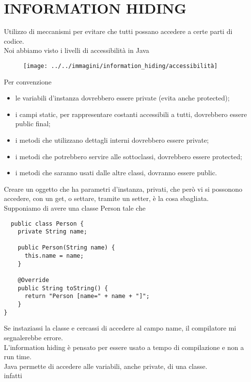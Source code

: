 \chapter{INFORMATION HIDING}

Utilizzo di meccanismi per evitare che tutti possano accedere a certe parti di codice.\\
Noi abbiamo visto i livelli di accessibilità in Java

\begin{figure}[H]
  \centering
  \texttt{[image: ../../immagini/information\_hiding/accessibilità]}
\end{figure}

Per convenzione

\begin{itemize}
  \item le variabili d'instanza dovrebbero essere private (evita anche protected);
  \item i campi static, per rappresentare costanti accessibili a tutti, dovrebbero essere public final;
  \item i metodi che utilizzano dettagli interni dovrebbero essere private;
  \item i metodi che potrebbero servire alle sottoclassi, dovrebbero essere protected;
  \item i metodi che saranno usati dalle altre classi, dovranno essere public.
\end{itemize}

Creare un oggetto che ha parametri d'instanza, privati, che però vi si possonono accedere, con un get, o settare, tramite un setter, è la cosa sbagliata.\\
Supponiamo di avere una classe Person tale che

\begin{lstlisting}
  public class Person {
    private String name;
    
    public Person(String name) {
      this.name = name;
    }
    
    @Override
    public String toString() {
      return "Person [name=" + name + "]";
    }
}
\end{lstlisting}

Se instaziassi la classe e cercassi di accedere al campo name, il compilatore mi segnalerebbe errore.\\
L'information hiding è pensato per essere usato a tempo di compilazione e non a run time.\\
Java permette di accedere alle variabili, anche private, di una classe.\\
infatti

